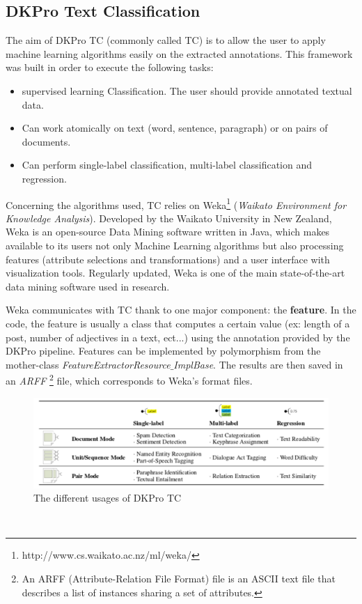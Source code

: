 \subsection{DKPro Text Classification}
The aim of DKPro TC (commonly called TC) is to allow the user to apply machine learning algorithms easily on the extracted annotations. This framework was built in order to execute the following tasks:
\begin{itemize}
  \item \Gls{supervised learning} Classification. The user should provide annotated textual data.
  \item Can work atomically on text (word, sentence, paragraph) or on pairs of documents.
  \item Can perform \gls{single-label} classification, \gls{multi-label} classification and \gls{regression}.
\end{itemize}

Concerning the algorithms used, TC relies on Weka\footnote{http://www.cs.waikato.ac.nz/ml/weka/} (\textit{Waikato Environment for Knowledge Analysis}). Developed by the Waikato University in New Zealand, Weka is an open-source Data Mining software written in Java, which makes available to its users not only Machine Learning algorithms but also processing features (attribute selections and transformations) and a user interface with visualization tools. Regularly updated, Weka is one of the main state-of-the-art data mining software used in research. 
\

Weka communicates with TC thank to one major component: the \textbf{feature}. In the code, the feature is usually a class that computes a certain value (ex: length of a post, number of adjectives in a text, ect...) using the annotation provided by the DKPro pipeline. Features can be implemented by polymorphism from the mother-class \textit{FeatureExtractorResource$\_$ImplBase}. The results are then saved in an \textit{ARFF} \footnote{An ARFF (Attribute-Relation File Format) file is an ASCII text file that describes a list of instances sharing a set of attributes.} file, which corresponds to Weka's format files.  
\
\begin{figure}[H]
    \centering
    \includegraphics[width=1\textwidth]{fig/TC-modes.png}
    \caption[Short caption]{The different usages of DKPro TC}
    \label{fig:dkpro-tc-usages}
\end{figure}
\

